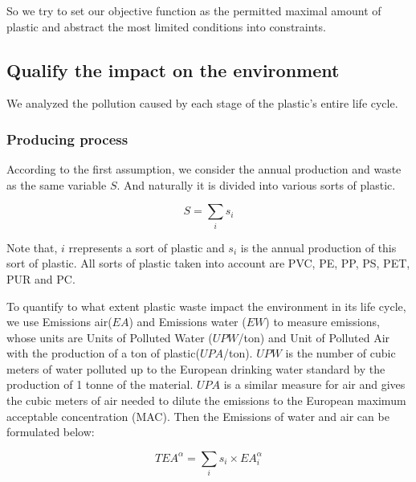 \documentclass{mcmthesis}
\begin{document}
So we try to set our objective function as the permitted maximal amount of plastic and abstract the most limited conditions into constraints.

%



\subsection{Qualify the impact on the environment}

We analyzed the pollution caused by each stage of the plastic's entire life cycle.

\subsubsection{Producing process}

According to the first assumption, we consider the annual production and waste as the same variable $S$. And naturally it is divided into various sorts of plastic.

\begin{equation}
S = \sum_i{s_i}
\label{S}
\end{equation}

Note that, $i$ rrepresents a sort of plastic and $s_i$ is the annual production of this sort of plastic. All sorts of plastic taken into account are PVC, PE, PP, PS, PET, PUR and PC\cite{book}.

To quantify to what extent plastic waste impact the environment in its life cycle, we use Emissions air($EA$) and Emissions water ($EW$) to measure emissions, whose units are Units of Polluted Water ($UPW$/ton) and Unit of Polluted Air with the production of a ton of plastic($UPA$/ton). $UPW$ is the number of cubic meters of water polluted up to the European drinking water standard by the production of 1 tonne of the material. $UPA$ is a similar measure for air and gives the cubic meters of air needed to dilute the emissions to the European maximum acceptable concentration (MAC)\cite{book}. Then the Emissions of water and air can be formulated below:

\begin{equation}
TEA^{\alpha} = \sum_i{s_i}\times EA_i^\alpha
\label{EA}
\end{equation}
\end{document}
